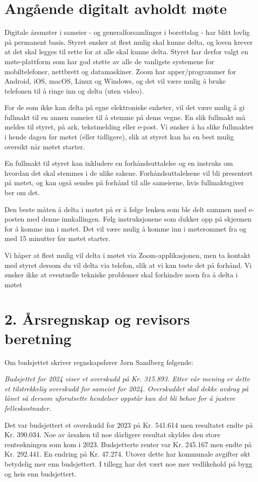 \documentclass[12pt]{article}
\begin{document}
\pagebreak
\section*{Angående digitalt avholdt møte}

Digitale årsmøter i sameier - og generalforsamlinger i borettslag - har blitt lovlig på permanent
basis. Styret ønsker at flest mulig skal kunne delta, og loven krever at det skal legges til rette
for at alle skal kunne delta. Styret har derfor valgt en møte-plattform som har god støtte av alle
de vanligste systemene for mobiltelefoner, nettbrett og datamaskiner. Zoom har apper/programmer for
Android, iOS, macOS, Linux og Windows, og det vil være mulig å bruke telefonen til å ringe inn og
delta (uten video).

For de som ikke kan delta på egne elektroniske enheter, vil det være mulig å gi fullmakt til en
annen sameier til å stemme på dems vegne. En slik fullmakt må meldes til styret, på ark,
tekstmelding eller e-post. Vi ønsker å ha slike fullmakter i hende dagen før møtet (eller
tidligere), slik at styret kan ha en best mulig oversikt når møtet starter.

En fullmakt til styret kan inkludere en forhåndsuttalelse og en instruks om hvordan det skal
stemmes i de ulike sakene. Forhåndsuttalelsene vil bli presentert på møtet, og kan også sendes på
forhånd til alle sameierne, hvis fullmaktsgiver ber om det.

Den beste måten å delta i møtet på er å følge lenken som ble delt sammen med e-posten med denne
innkallingen. Følg instruksjonene som dukker opp på skjermen for å komme inn i møtet.  Det vil være
mulig å komme inn i møterommet fra og med 15 minutter før møtet starter.

Vi håper at flest mulig vil delta i møtet via Zoom-applikasjonen, men ta kontakt med styret dersom
du vil delta via telefon, slik at vi kan teste det på forhånd. Vi ønsker ikke at eventuelle tekniske
problemer skal forhindre noen fra å delta i møtet

\pagebreak
\section*{2. Årsregnskap og revisors beretning}
Om budsjettet skriver regnskapsfører Jørn Sandberg følgende:

{\it Budsjettet for 2024 viser et overskudd på Kr. 315.893. Etter vår mening er dette et tilstrekkelig
overskudd for sameiet for 2024. Overskuddet skal dekke avdrag på lånet så dersom uforutsette
hendelser oppstår kan det bli behov for å justere felleskostnader.

Det var budsjettert et overskudd for 2023 på Kr. 541.614 men resultatet endte på Kr. 390.034. Noe
av årsaken til noe dårligere resultat skyldes den store renteøkningen som kom i 2023. Budsjetterte
renter var Kr. 245.167 men endte på Kr. 292.441. En endring på Kr. 47.274. Utover dette har
kommunale avgifter økt betydelig mer enn budsjettert. I tillegg har det vært noe mer vedlikehold på
bygg og heis enn budsjettert.}
\end{document}
